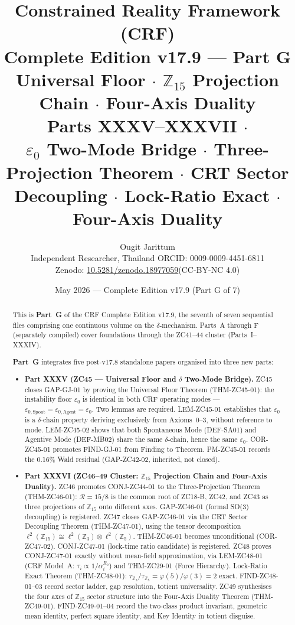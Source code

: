 \documentclass[12pt, a4paper]{article}
\title{%
  \textbf{\color{deepblue}Constrained Reality Framework (CRF)}\\[0.4em]
  \large Complete Edition v17.9 --- Part G\\
  \large Universal Floor $\cdot$ $\mathbb{Z}_{15}$ Projection Chain
    $\cdot$ Four-Axis Duality\\[0.3em]
  \normalsize\color{mutedgray}
  Parts XXXV--XXXVII $\cdot$\\
  $\varepsilon_0$ Two-Mode Bridge $\cdot$
  Three-Projection Theorem $\cdot$
  CRT Sector Decoupling $\cdot$
  Lock-Ratio Exact $\cdot$
  Four-Axis Duality
}
\author{Ougit Jarittum\\
\small Independent Researcher, Thailand\quad
ORCID: 0009-0009-4451-6811\\
\small Zenodo: \href{https://doi.org/10.5281/zenodo.18977059}%
{10.5281/zenodo.18977059}\quad (CC-BY-NC 4.0)
}
\date{May 2026 --- Complete Edition v17.9 (Part G of 7)}
\begin{document}

\maketitle

\begin{abstract}
\sloppy
This is \textbf{Part~G} of the CRF Complete Edition v17.9, the seventh
of seven sequential files comprising one continuous volume on the
$\delta$-mechanism. Parts~A through F (separately compiled) cover
foundations through the ZC41--44 cluster (Parts~I--XXXIV).

\textbf{Part~G} integrates five post-v17.8 standalone papers organised
into three new parts:

\begin{itemize}[leftmargin=2em]
\item \textbf{Part XXXV (ZC45 --- Universal Floor and $\delta$ Two-Mode
  Bridge).}
ZC45 closes GAP-GJ-01 by proving the Universal Floor Theorem
(THM-ZC45-01): the instability floor $\varepsilon_0$ is identical
in both CRF operating modes ---
$\varepsilon_{0,\mathrm{Spont}} = \varepsilon_{0,\mathrm{Agent}} = \varepsilon_0$.
Two lemmas are required. LEM-ZC45-01 establishes that $\varepsilon_0$
is a $\delta$-chain property deriving exclusively from Axioms~0--3,
without reference to mode. LEM-ZC45-02 shows that both Spontaneous Mode
(DEF-SA01) and Agentive Mode (DEF-MB02) share the same $\delta$-chain,
hence the same $\varepsilon_0$. COR-ZC45-01 promotes FIND-GJ-01 from
Finding to Theorem. PM-ZC45-01 records the 0.16\% Wald residual
(GAP-ZC42-02, inherited, not closed).

\item \textbf{Part XXXVI (ZC46--49 Cluster: $\mathbb{Z}_{15}$ Projection
  Chain and Four-Axis Duality).}
ZC46 promotes CONJ-ZC44-01 to the Three-Projection Theorem
(THM-ZC46-01): $\mathcal{R} = 15/8$ is the common root of ZC18-B,
ZC42, and ZC43 as three projections of $\mathbb{Z}_{15}$ onto different
axes. GAP-ZC46-01 (formal SO(3) decoupling) is registered.
ZC47 closes GAP-ZC46-01 via the CRT Sector Decoupling Theorem
(THM-ZC47-01), using the tensor decomposition
$\ell^2(\mathbb{Z}_{15}) \cong \ell^2(\mathbb{Z}_3) \otimes
\ell^2(\mathbb{Z}_5)$. THM-ZC46-01 becomes unconditional (COR-ZC47-02).
CONJ-ZC47-01 (lock-time ratio candidate) is registered.
ZC48 proves CONJ-ZC47-01 exactly without mean-field approximation,
via LEM-ZC48-01 (CRF Model~A: $\tau_i \propto 1/\alpha_i^{R_0}$)
and THM-ZC29-01 (Force Hierarchy). Lock-Ratio Exact Theorem
(THM-ZC48-01): $\tau_{\mathbb{Z}_3}/\tau_{\mathbb{Z}_5} = \varphi(5)/\varphi(3) = 2$
exact. FIND-ZC48-01--03 record sector ladder, gap resolution, totient
universality.
ZC49 synthesises the four axes of $\mathbb{Z}_{15}$ sector structure
into the Four-Axis Duality Theorem (THM-ZC49-01). FIND-ZC49-01--04
record the two-class product invariant, geometric mean identity, perfect
square identity, and Key Identity in totient disguise.


\end{itemize}
\end{abstract}
\end{document}
